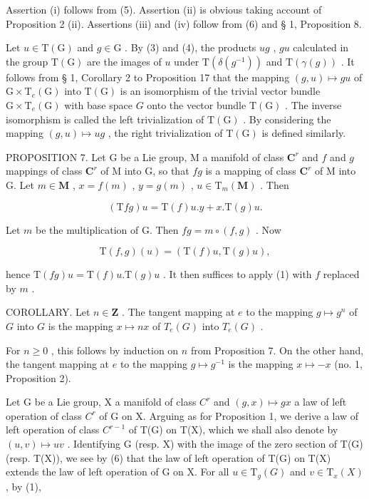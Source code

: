 Assertion (i) follows from (5). Assertion (ii) is obvious taking account of Proposition 2 (ii). Assertions (iii) and (iv) follow from (6) and § 1, Proposition 8.

Let \(u \in \mathrm{T}(\mathrm{G})\) and \(g \in \mathrm{G}\) . By (3) and (4), the products \(ug\) , \(gu\) calculated in the group \(\mathrm{T}(\mathrm{G})\) are the images of \(u\) under \(\mathrm{T}(\delta(g^{-1}))\) and \(\mathrm{T}(\gamma(g))\) . It follows from § 1, Corollary 2 to Proposition 17 that the mapping \((g, u) \mapsto gu\) of \(\mathrm{G} \times \mathrm{T}_e(\mathrm{G})\) into \(\mathrm{T}(\mathrm{G})\) is an isomorphism of the trivial vector bundle \(\mathrm{G} \times \mathrm{T}_e(\mathrm{G})\) with base space \(G\) onto the vector bundle \(\mathrm{T}(\mathrm{G})\) . The inverse isomorphism is called the left trivialization of \(\mathrm{T}(\mathrm{G})\) . By considering the mapping \((g, u) \mapsto ug\) , the right trivialization of \(\mathrm{T}(\mathrm{G})\) is defined similarly.

PROPOSITION 7. Let G be a Lie group, M a manifold of class \(\mathbf{C}^r\) and \(f\) and \(g\) mappings of class \(\mathbf{C}^r\) of M into G, so that \(fg\) is a mapping of class \(\mathbf{C}^r\) of M into G. Let \(m \in \mathbf{M}\) , \(x = f(m)\) , \(y = g(m)\) , \(u \in \mathrm{T}_m(\mathbf{M})\) . Then

\[
(\mathrm{T} f g) u = \mathrm{T} (f) u. y + x. \mathrm{T} (g) u.
\]

Let \(m\) be the multiplication of G. Then \(fg = m \circ (f, g)\) . Now

\[
\mathrm{T} (f, g) (u) = (\mathrm{T} (f) u, \mathrm{T} (g) u),
\]

hence \(\mathrm{T}(fg)u = \mathrm{T}(f)u.\mathrm{T}(g)u\) . It then suffices to apply (1) with \(f\) replaced by \(m\) .

COROLLARY. Let \(n \in \mathbf{Z}\) . The tangent mapping at \(e\) to the mapping \(g \mapsto g^n\) of \(G\) into \(G\) is the mapping \(x \mapsto nx\) of \(T_e(G)\) into \(T_e(G)\) .

For \(n \geqslant 0\) , this follows by induction on \(n\) from Proposition 7. On the other hand, the tangent mapping at \(e\) to the mapping \(g \mapsto g^{-1}\) is the mapping \(x \mapsto -x\) (no. 1, Proposition 2).

Let G be a Lie group, X a manifold of class \(C^r\) and \((g, x) \mapsto gx\) a law of left operation of class \(C^r\) of G on X. Arguing as for Proposition 1, we derive a law of left operation of class \(C^{r-1}\) of T(G) on T(X), which we shall also denote by \((u, v) \mapsto uv\) . Identifying G (resp. X) with the image of the zero section of T(G) (resp. T(X)), we see by (6) that the law of left operation of T(G) on T(X) extends the law of left operation of G on X. For all \(u \in \mathrm{T}_{g}(G)\) and \(v \in \mathrm{T}_{x}(X)\) , by (1),

